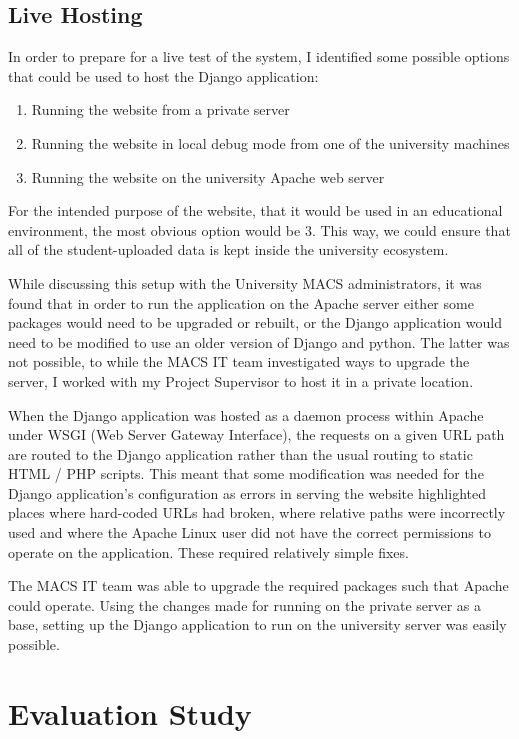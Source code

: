 \documentclass[a4paper,11pt]{report}
\begin{document}
\section{Live Hosting}
In order to prepare for a live test of the system, I identified some possible options that could be used to host the Django application:
\begin{enumerate}
\item Running the website from a private server
\item Running the website in local debug mode from one of the university machines
\item Running the website on the university Apache web server
\end{enumerate}
For the intended purpose of the website, that it would be used in an educational environment, the most obvious option would be 3. This way, we could ensure that all of the student-uploaded data is kept inside the university ecosystem.\par
While discussing this setup with the University MACS administrators, it was found that in order to run the application on the Apache server either some packages would need to be upgraded or rebuilt, or the Django application would need to be modified to use an older version of Django and python. The latter was not possible, to while the MACS IT team investigated ways to upgrade the server, I worked with my Project Supervisor to host it in a private location.\par
When the Django application was hosted as a daemon process within Apache under WSGI (Web Server Gateway Interface), the requests on a given URL path are routed to the Django application rather than the usual routing to static HTML / PHP scripts. This meant that some modification was needed for the Django application's configuration as errors in serving the website highlighted places where  hard-coded URLs had broken, where relative paths were incorrectly used and where the Apache Linux user did not have the correct permissions to operate on the application. These required relatively simple fixes.\par
The MACS IT team was able to upgrade the required packages such that Apache could operate. Using the changes made for running on the private server as a base, setting up the Django application to run on the university server was easily possible.

\chapter{Evaluation Study}
\end{document}
